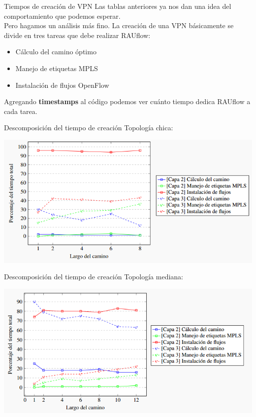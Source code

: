 \documentclass[xcolor=svgnames]{beamer}
\begin{document}
\begin{frame}{Tiempos de creación de VPN}
	Las tablas anteriores ya nos dan una idea del comportamiento que podemos esperar. \\
	
	Pero hagamos un análisis más fino. La creación de una VPN básicamente se divide en tres tareas que debe realizar RAUflow:
	\begin{itemize}
		\item Cálculo del camino óptimo
		\item Manejo de etiquetas MPLS
		\item Instalación de flujos OpenFlow
	\end{itemize}
	Agregando \textbf{timestamps} al código podemos ver cuánto tiempo dedica RAUflow a cada tarea.
\end{frame}

\begin{frame}{Descomposición del tiempo de creación}
	Topología chica:
	\begin{center}
		\includegraphics[scale=0.6]{porcentajes_tiempos_chica}
	\end{center}
\end{frame}

\begin{frame}{Descomposición del tiempo de creación}
	Topología mediana:
	\begin{center}
		\includegraphics[scale=0.6]{porcentajes_tiempos_mediana}
	\end{center}
\end{frame}
\end{document}
